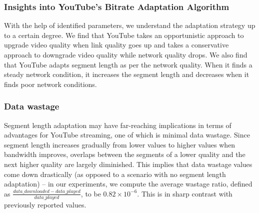\subsubsection{Insights into YouTube’s Bitrate Adaptation Algorithm}
With the help of identified parameters, we understand the adaptation strategy up to a certain degree. We find that YouTube takes an opportunistic approach to upgrade video quality when link quality goes up and takes a conservative approach to downgrade video quality while network quality drops. We also find that YouTube adapts segment length as per the network quality. When it finds a steady network condition, it increases the segment length and decreases when it finds poor network conditions.
\subsubsection{Data wastage}
Segment length adaptation may have far-reaching implications in terms of advantages for YouTube streaming, one of which is minimal data wastage. Since segment length increases gradually from lower values to higher values when bandwidth improves, overlaps between the segments of a lower quality and the next higher quality are largely diminished. This implies that data wastage values come down drastically (as opposed to a scenario with no segment length adaptation) – in our experiments, we compute the average wastage ratio, defined as $\frac{data\_downloaded - data\_played}{data\_played}$, to be $0.82\times10^{-6}$. This is in sharp contrast with previously reported values.
